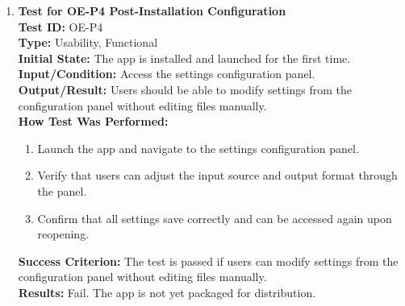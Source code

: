 \documentclass[12pt, titlepage]{article}
\begin{document}
\begin{enumerate}
    \item \textbf{Test for OE-P4 Post-Installation Configuration} \\
      \newline
      \textbf{Test ID:} OE-P4 \\
      \textbf{Type:} Usability, Functional \\
      \textbf{Initial State:} The app is installed and launched for the first time. \\
      \textbf{Input/Condition:} Access the settings configuration panel. \\
      \textbf{Output/Result:} Users should be able to modify settings from the configuration panel without editing files manually. \\
      \textbf{How Test Was Performed:}
      \begin{enumerate}
          \item Launch the app and navigate to the settings configuration panel.
          \item Verify that users can adjust the input source and output format through the panel.
          \item Confirm that all settings save correctly and can be accessed again upon reopening.
      \end{enumerate}
      \textbf{Success Criterion:} The test is passed if users can modify settings from the configuration panel without editing files manually.\\
      \textbf{Results:} Fail. The app is not yet packaged for distribution.\\


\end{enumerate}
\end{document}
